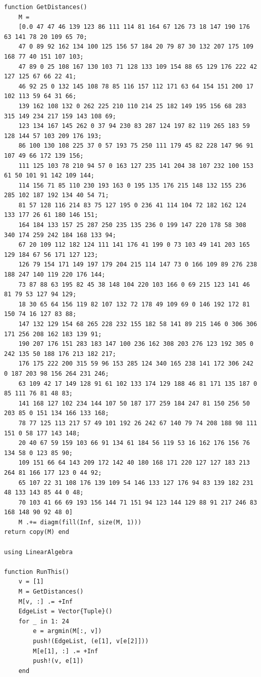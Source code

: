 \documentclass[]{article}
\theoremstyle{definition}
\begin{document}
\begin{lstlisting}
function GetDistances()
    M = 
    [0.0 47 47 46 139 123 86 111 114 81 164 67 126 73 18 147 190 176 63 141 78 20 109 65 70;
    47 0 89 92 162 134 100 125 156 57 184 20 79 87 30 132 207 175 109 168 77 40 151 107 103;
    47 89 0 25 108 167 130 103 71 128 133 109 154 88 65 129 176 222 42 127 125 67 66 22 41;
    46 92 25 0 132 145 108 78 85 116 157 112 171 63 64 154 151 200 17 102 113 59 64 31 66;
    139 162 108 132 0 262 225 210 110 214 25 182 149 195 156 68 283 315 149 234 217 159 143 108 69;
    123 134 167 145 262 0 37 94 230 83 287 124 197 82 119 265 183 59 128 144 57 103 209 176 193;
    86 100 130 108 225 37 0 57 193 75 250 111 179 45 82 228 147 96 91 107 49 66 172 139 156;
    111 125 103 78 210 94 57 0 163 127 235 141 204 38 107 232 100 153 61 50 101 91 142 109 144;
    114 156 71 85 110 230 193 163 0 195 135 176 215 148 132 155 236 285 102 187 192 134 40 54 71;
    81 57 128 116 214 83 75 127 195 0 236 41 114 104 72 182 162 124 133 177 26 61 180 146 151;
    164 184 133 157 25 287 250 235 135 236 0 199 147 220 178 58 308 340 174 259 242 184 168 133 94;
    67 20 109 112 182 124 111 141 176 41 199 0 73 103 49 141 203 165 129 184 67 56 171 127 123;
    126 79 154 171 149 197 179 204 215 114 147 73 0 166 109 89 276 238 188 247 140 119 220 176 144;
    73 87 88 63 195 82 45 38 148 104 220 103 166 0 69 215 123 141 46 81 79 53 127 94 129;
    18 30 65 64 156 119 82 107 132 72 178 49 109 69 0 146 192 172 81 150 74 16 127 83 88;
    147 132 129 154 68 265 228 232 155 182 58 141 89 215 146 0 306 306 171 256 208 162 183 139 91;
    190 207 176 151 283 183 147 100 236 162 308 203 276 123 192 305 0 242 135 50 188 176 213 182 217;
    176 175 222 200 315 59 96 153 285 124 340 165 238 141 172 306 242 0 187 203 98 156 264 231 246;
    63 109 42 17 149 128 91 61 102 133 174 129 188 46 81 171 135 187 0 85 111 76 81 48 83;
    141 168 127 102 234 144 107 50 187 177 259 184 247 81 150 256 50 203 85 0 151 134 166 133 168;
    78 77 125 113 217 57 49 101 192 26 242 67 140 79 74 208 188 98 111 151 0 58 177 143 148;
    20 40 67 59 159 103 66 91 134 61 184 56 119 53 16 162 176 156 76 134 58 0 123 85 90;
    109 151 66 64 143 209 172 142 40 180 168 171 220 127 127 183 213 264 81 166 177 123 0 44 92;
    65 107 22 31 108 176 139 109 54 146 133 127 176 94 83 139 182 231 48 133 143 85 44 0 48;
    70 103 41 66 69 193 156 144 71 151 94 123 144 129 88 91 217 246 83 168 148 90 92 48 0]
    M .+= diagm(fill(Inf, size(M, 1)))
return copy(M) end

using LinearAlgebra

function RunThis()
    v = [1]
    M = GetDistances()
    M[v, :] .= +Inf
    EdgeList = Vector{Tuple}()
    for _ in 1: 24
        e = argmin(M[:, v])
        push!(EdgeList, (e[1], v[e[2]]))
        M[e[1], :] .= +Inf
        push!(v, e[1])
    end
    

\end{lstlisting}
\end{document}
